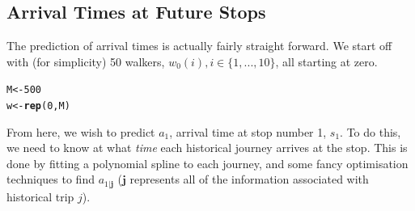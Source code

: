 \documentclass[11pt]{article}\usepackage[]{graphicx}\usepackage[]{color}
\makeatletter
\newcommand{\hlnum}[1]{\textcolor[rgb]{0.686,0.059,0.569}{#1}}%
\newcommand{\hlstd}[1]{\textcolor[rgb]{0.345,0.345,0.345}{#1}}%
\newcommand{\hlkwb}[1]{\textcolor[rgb]{0.69,0.353,0.396}{#1}}%
\newcommand{\hlkwd}[1]{\textcolor[rgb]{0.737,0.353,0.396}{\textbf{#1}}}%
\newenvironment{kframe}{%
 \def\at@end@of@kframe{}%
 \ifinner\ifhmode%
  \def\at@end@of@kframe{\end{minipage}}%
  \begin{minipage}{\columnwidth}%
 \fi\fi%
 \def\FrameCommand##1{\hskip\@totalleftmargin \hskip-\fboxsep
 \colorbox{shadecolor}{##1}\hskip-\fboxsep
     \hskip-\linewidth \hskip-\@totalleftmargin \hskip\columnwidth}%
 \MakeFramed {\advance\hsize-\width
   \@totalleftmargin\z@ \linewidth\hsize
   \@setminipage}}%
 {\par\unskip\endMakeFramed%
 \at@end@of@kframe}
\newenvironment{knitrout}{}{} %
\makeatother
\begin{document}
\subsection{Arrival Times at Future Stops}
\label{sec:future_arrival_times}


The prediction of arrival times is actually fairly straight forward.
We start off with (for simplicity) 50 walkers, $w_0(i), i \in \{1,...,10\}$, 
all starting at zero.

\begin{knitrout}
\color{fgcolor}\begin{kframe}
\begin{alltt}
\hlstd{M} \hlkwb{<-} \hlnum{500}
\hlstd{w} \hlkwb{<-} \hlkwd{rep}\hlstd{(}\hlnum{0}\hlstd{, M)}
\end{alltt}
\end{kframe}
\end{knitrout}

From here, we wish to predict $a_1$, arrival time at stop number 1, $s_1$.
To do this, we need to know at what \emph{time} each historical journey arrives at the stop.
This is done by fitting a polynomial spline to each journey, 
and some fancy optimisation techniques to find $a_{1|\boldsymbol{j}}$ 
($\boldsymbol{j}$ represents all of the information associated with historical trip $j$).
\end{document}
